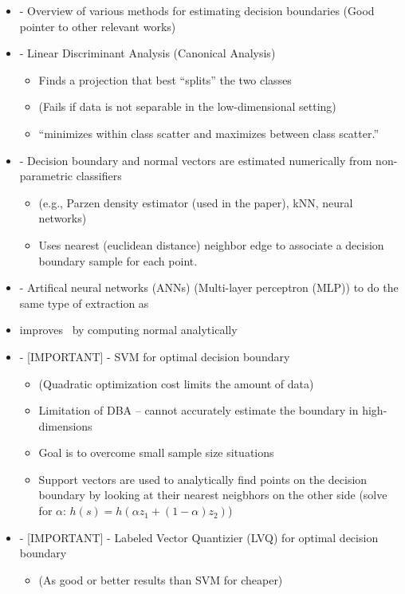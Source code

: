 \documentclass[12pt]{article}
\begin{document}
\begin{itemize}
	\item \cite{DiamantiniPotena2007} - Overview of various methods for
	estimating decision boundaries (Good pointer to other relevant works)
	\item  \cite{Fukunaga1990,ParkParkPardalos2004} - Linear Discriminant
	Analysis (Canonical Analysis)
	\begin{itemize}
		\item Finds a projection that best ``splits'' the two classes
		\item (Fails if data is not separable in the low-dimensional setting)
		\item ``minimizes within class scatter and maximizes between class
		scatter.''
	\end{itemize}
	\item \cite{LeeLandgrebe1993} - Decision boundary and normal vectors are
	estimated numerically from non-parametric classifiers
	\begin{itemize}
		\item  (e.g., Parzen density estimator (used in the paper), kNN, neural
		networks)
		\item Uses nearest (euclidean distance) neighbor edge to associate a
		decision boundary sample for each point.
	\end{itemize}
	\item \cite{LeeLandgrebe1997} - Artifical neural networks (ANNs)
	(Multi-layer perceptron (MLP)) to do the same type of extraction
	as~\cite{LeeLandgrebe1993}
	\item \cite{GoLee2003} improves~\cite{LeeLandgrebe1997} by computing normal
	analytically
	\item \cite{ZhangLiu2005} - [IMPORTANT] - SVM for optimal decision boundary
	\begin{itemize}
		\item (Quadratic optimization cost limits the amount of data)
		\item Limitation of DBA -- cannot accurately estimate the boundary in
		high-dimensions
		\item Goal is to overcome small sample size situations
		\item Support vectors are used to analytically find points on the
		decision boundary by looking at their nearest neigbhors on the other
		side (solve for $\alpha$: $h(s) = h(\alpha z_1 + (1 - \alpha) z_2)$)
	\end{itemize}
	\item \cite{DiamantiniPotena2006} - [IMPORTANT] - Labeled Vector Quantizier
	(LVQ) for optimal decision boundary 
	\begin{itemize}
		\item (As good or better results than SVM for cheaper) 
	\end{itemize}
\end{itemize}
\end{document}
